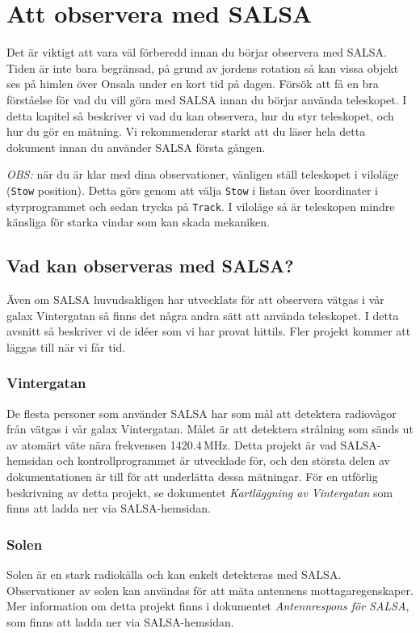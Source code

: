 \chapter{Att observera med SALSA}
Det är viktigt att vara väl förberedd innan du börjar observera med SALSA.
Tiden är inte bara begränsad, på grund av jordens rotation så kan vissa objekt
ses på himlen över Onsala under en kort tid på dagen. Försök att få en bra
förståelse för vad du vill göra med SALSA innan du börjar använda teleskopet.
I detta kapitel så beskriver vi vad du kan observera, hur du styr teleskopet,
och hur du gör en mätning. Vi rekommenderar starkt att du läser hela detta
dokument innan du använder SALSA första gången.

\emph{OBS:} när du är klar med dina observationer, vänligen ställ teleskopet i
viloläge (\verb!Stow! position). Detta görs genom att välja \verb!Stow! i listan
över koordinater i styrprogrammet och sedan trycka på \verb!Track!. I viloläge
så är teleskopen mindre känsliga för starka vindar som kan skada mekaniken. 

\section{Vad kan observeras med SALSA?}
Även om SALSA huvudsakligen har utvecklats för att observera vätgas i vår 
galax Vintergatan så finns det några andra sätt att använda teleskopet. 
I detta avsnitt så beskriver vi de idéer som vi har provat hittils. Fler
projekt kommer att läggas till när vi får tid. 

\subsection{Vintergatan}
De flesta personer som använder SALSA har som mål att detektera radiovågor från 
vätgas i vår galax Vintergatan. Målet är att detektera strålning som sänds ut av
atomärt väte nära frekvensen 1420.4\,MHz. Detta projekt är vad SALSA-hemsidan
och kontrollprogrammet är utvecklade för, och den största delen av dokumentationen
är till för att underlätta dessa mätningar. För en utförlig beskrivning av detta
projekt, se dokumentet \emph{Kartläggning av Vintergatan} som finns att 
ladda ner via SALSA-hemsidan.

\subsection{Solen}
Solen är en stark radiokälla och kan enkelt detekteras med SALSA. Observationer
av solen kan användas för att mäta antennens mottagaregenskaper. Mer information
om detta projekt finns i dokumentet \emph{Antennrespons för SALSA}, som finns
att ladda ner via SALSA-hemsidan. 

